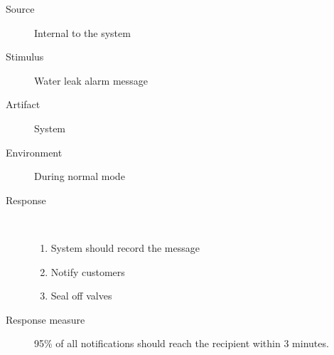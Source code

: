 \begin{description}
	\item[Source] Internal to the system
	\item[Stimulus] Water leak alarm message
	\item[Artifact] System
	\item[Environment] During normal mode
	\item[Response] \
		\begin{enumerate}
		  \item System should record the message
		  \item Notify customers
		  \item Seal off valves
		\end{enumerate}
	\item[Response measure] 95\% of all notifications should reach the recipient
	within 3 minutes. 
\end{description}